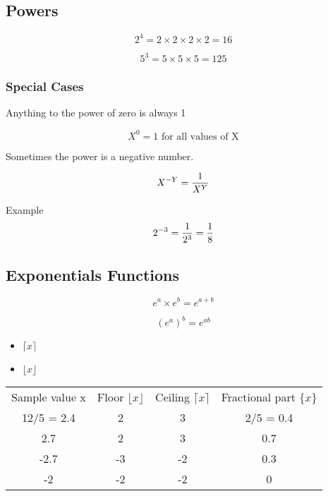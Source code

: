 \documentclass[12pt]{article}
\begin{document}
\subsection{Powers}

\[  2^ 4 = 2 \times 2 \times 2 \times 2 = 16 \]

\[  5^ 3 = 5 \times 5 \times 5 =125 \]

\subsubsection{Special Cases}

Anything to the power of zero is always 1

\[  X^ 0 = 1 \mbox{ for all values of X} \]

Sometimes the power is a negative number.

\[  X^{-Y} = { 1 \over X^Y}  \]

Example 
\[  2^{-3} = { 1 \over 2^3} = { 1 \over 8}  \]



\subsection{Exponentials Functions}

\[ e^a \times e^b = e^{a+b}\]

\[ (e^a )^b = e^{ab}\]

\begin{itemize}
\item $\lceil x\rceil$

\item $\lfloor x\rfloor$
\end{itemize}

\begin{tabular}{|c|c|c|c|}
\hline Sample value x & Floor $\lfloor x\rfloor$ & Ceiling  $\lceil x\rceil$ & Fractional part $ \{ x \} $\\
12/5 = 2.4 &	2	&3&	2/5 = 0.4\\
2.7&	2&	3	&0.7\\
-2.7&	-3&	-2	&0.3\\
-2&	-2&	-2	&0\\
\hline 
\end{tabular} 
\end{document}
